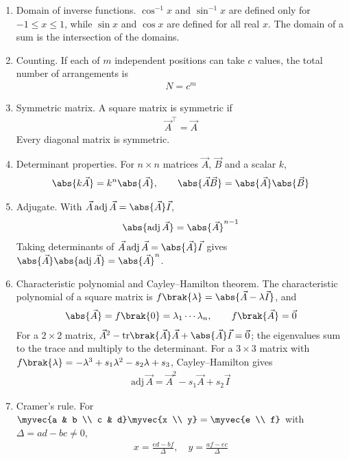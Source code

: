 \begin{enumerate}[label=\thesubsection.\arabic*, ref=\thesubsection.\theenumi]
\item Domain of inverse functions. $\cos^{-1}x$ and $\sin^{-1}x$ are defined only for $-1 \le x \le 1$, while $\sin x$ and $\cos x$ are defined for all real $x$. The domain of a sum is the intersection of the domains. 
\item Counting. If each of $m$ independent positions can take $c$ values, the total number of arrangements is
\begin{align}
	N = c^m \label{eq:CBSE12-count}
\end{align}
\item Symmetric matrix. A square matrix is symmetric if
\begin{align}
	\vec{A}^{\top} = \vec{A} \label{eq:CBSE12-symmetric}
\end{align}
Every diagonal matrix is symmetric.
\item Determinant properties. For $n\times n$ matrices $\vec{A}$, $\vec{B}$ and a scalar $k$,
\begin{align}
	\abs{k\vec{A}} = k^n\abs{\vec{A}}, \qquad \abs{\vec{A}\vec{B}} = \abs{\vec{A}}\abs{\vec{B}} \label{eq:CBSE12-det}
\end{align}
\item Adjugate. With $\vec{A}\,\text{adj}\,\vec{A} = \abs{\vec{A}}\vec{I}$,
\begin{align}
	\abs{\text{adj}\,\vec{A}} = \abs{\vec{A}}^{n-1} \label{eq:CBSE12-adj}
\end{align}
\solution
Taking determinants of $\vec{A}\,\text{adj}\,\vec{A} = \abs{\vec{A}}\vec{I}$ gives $\abs{\vec{A}}\abs{\text{adj}\,\vec{A}} = \abs{\vec{A}}^n$. 
\item Characteristic polynomial and Cayley--Hamilton theorem. The characteristic polynomial of a square matrix is $f\brak{\lambda} = \abs{\vec{A} - \lambda\vec{I}}$, and
\begin{align}
	\abs{\vec{A}} = f\brak{0} = \lambda_1\cdots\lambda_n, \qquad f\brak{\vec{A}} = \vec{0} \label{eq:CBSE12-ch}
\end{align}
For a $2\times2$ matrix, $\vec{A}^2 - \text{tr}\brak{\vec{A}}\vec{A} + \abs{\vec{A}}\vec{I} = \vec{0}$; the eigenvalues sum to the trace and multiply to the determinant. For a $3\times3$ matrix with $f\brak{\lambda} = -\lambda^3 + s_1\lambda^2 - s_2\lambda + s_3$, Cayley--Hamilton gives
\begin{align}
	\text{adj}\,\vec{A} = \vec{A}^2 - s_1\vec{A} + s_2\vec{I} \label{eq:CBSE12-adjch}
\end{align}
\item Cramer's rule. For $\myvec{a & b \\ c & d}\myvec{x \\ y} = \myvec{e \\ f}$ with $\Delta = ad - bc \neq 0$,
\begin{align}
	x = \frac{ed - bf}{\Delta}, \quad y = \frac{af - ec}{\Delta} \label{eq:CBSE12-cramer}
\end{align}


\end{enumerate}
